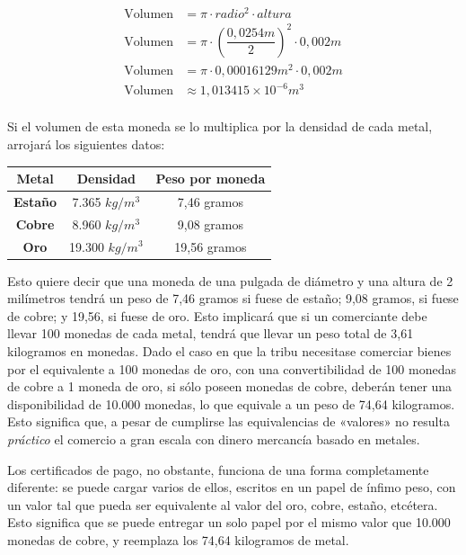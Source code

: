 \documentclass[12pt,a4paper,twoside]{book}
\begin{document}
\begin{align*}
\text{Volumen} &= \pi \cdot radio^{2} \cdot altura \\
\text{Volumen} &= \pi \cdot \left( \dfrac{0,0254m}{2} \right)^{2} \cdot 0,002m \\
\text{Volumen} &= \pi \cdot 0,00016129m^{2} \cdot 0,002m \\
\text{Volumen} & \approx 1,013415 \times 10^{-6} m^{3} \\
\end{align*}

Si el volumen de esta moneda se lo multiplica por la densidad de cada metal, arrojará los siguientes datos:

\begin{center}
\begin{tabular}{|c|c|c|}
\hline 
\textbf{Metal} & \textbf{Densidad} & \textbf{Peso por moneda} \\ 
\hline 
\textbf{Estaño} & 7.365 $ kg/m^{3} $ & 7,46 gramos \\ 
\hline 
\textbf{Cobre} & 8.960 $ kg/m^{3} $ & 9,08 gramos \\ 
\hline 
\textbf{Oro} & 19.300 $ kg/m^{3} $ & 19,56 gramos \\ 
\hline 
\end{tabular} 
\end{center}

Esto quiere decir que una moneda de una pulgada de diámetro y una altura de 2 milímetros tendrá un peso de 7,46 gramos si fuese de estaño; 9,08 gramos, si fuese de cobre; y 19,56, si fuese de oro. Esto implicará que si un comerciante debe llevar 100 monedas de cada metal, tendrá que llevar un peso total de 3,61 kilogramos en monedas. Dado el caso en que la tribu necesitase comerciar bienes por el equivalente a 100 monedas de oro, con una convertibilidad de 100 monedas de cobre a 1 moneda de oro, si sólo poseen monedas de cobre, deberán tener una disponibilidad de 10.000 monedas, lo que equivale a un peso de 74,64 kilogramos. Esto significa que, a pesar de cumplirse las equivalencias de «valores» no resulta \textit{práctico} el comercio a gran escala con dinero mercancía basado en metales.

Los certificados de pago, no obstante, funciona de una forma completamente diferente: se puede cargar varios de ellos, escritos en un papel de ínfimo peso, con un valor tal que pueda ser equivalente al valor del oro, cobre, estaño, etcétera. Esto significa que se puede entregar un solo papel por el mismo valor que 10.000 monedas de cobre, y reemplaza los 74,64 kilogramos de metal.
\end{document}
